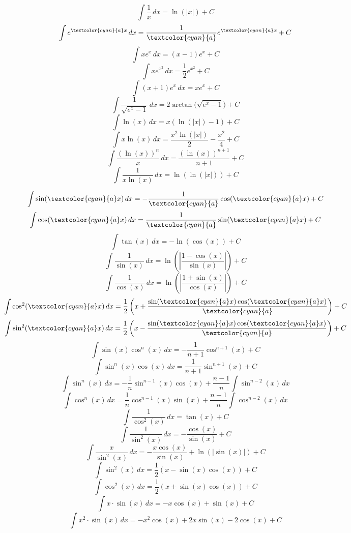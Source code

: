 \begin{formulabox}[breakable]
    \[
    \int \frac{1}{x}\,dx = \ln(|x|)+C
    \]
    \[
    \int e^{\textcolor{cyan}{a}x}\,dx = \frac{1}{\textcolor{cyan}{a}}e^{\textcolor{cyan}{a}x}+C
    \]
    \[
    \int x e^x\,dx = (x-1)e^x+C
    \]
    \[
    \int x e^{x^2}\,dx = \frac{1}{2}e^{x^2}+C
    \]
    \[
    \int (x+1)e^x\,dx = x e^x+C
    \]
    \[
    \int \frac{1}{\sqrt{e^x-1}}\,dx = 2\arctan\!\bigl(\sqrt{e^x-1}\bigr)+C
    \]
    \[
    \int \ln(x)\,dx = x(\ln(|x|)-1)+C
    \]
    \[
    \int x\ln(x)\,dx = \frac{x^2\ln(|x|)}{2}-\frac{x^2}{4}+C
    \]
    \[
    \int \frac{(\ln(x))^n}{x}\,dx = \frac{(\ln(x))^{n+1}}{n+1}+C
    \]
    \[
    \int \frac{1}{x\ln(x)}\,dx = \ln(\ln(|x|))+C
    \]
\end{formulabox}

\begin{formulabox}[breakable, break at=-\baselineskip/0pt]
    \[
    \int \sin(\textcolor{cyan}{a}x)\,dx = -\frac{1}{\textcolor{cyan}{a}}\cos(\textcolor{cyan}{a}x)+C
    \]
    \[
    \int \cos(\textcolor{cyan}{a}x)\,dx = \frac{1}{\textcolor{cyan}{a}}\sin(\textcolor{cyan}{a}x)+C
    \]
    \[
    \int \tan(x)\,dx = -\ln(\cos(x))+C
    \]
    \[
    \int \frac{1}{\sin(x)}\,dx = \ln\!\left(\left|\frac{1-\cos(x)}{\sin(x)}\right|\right)+C
    \]
    \[
    \int \frac{1}{\cos(x)}\,dx = \ln\!\left(\left|\frac{1+\sin(x)}{\cos(x)}\right|\right)+C
    \]
    \[
    \int \cos^2(\textcolor{cyan}{a}x)\,dx = \frac{1}{2}\left(x+\frac{\sin(\textcolor{cyan}{a}x)\cos(\textcolor{cyan}{a}x)}{\textcolor{cyan}{a}}\right)+C
    \]
    \[
    \int \sin^2(\textcolor{cyan}{a}x)\,dx = \frac{1}{2}\left(x-\frac{\sin(\textcolor{cyan}{a}x)\cos(\textcolor{cyan}{a}x)}{\textcolor{cyan}{a}}\right)+C
    \]
    \[
    \int \sin(x)\cos^n(x)\,dx = -\frac{1}{n+1}\cos^{n+1}(x)+C
    \]
    \[
    \int \sin^n(x)\cos(x)\,dx = \frac{1}{n+1}\sin^{n+1}(x)+C
    \]
    \[
    \int \sin^n(x)\,dx = -\frac{1}{n}\sin^{n-1}(x)\cos(x) + \frac{n-1}{n}\int \sin^{n-2}(x)\,dx
    \]
    \[
    \int \cos^n(x)\,dx = \frac{1}{n}\cos^{n-1}(x)\sin(x) + \frac{n-1}{n}\int \cos^{n-2}(x)\,dx
    \]
    \[
    \int \frac{1}{\cos^2(x)}\,dx = \tan(x)+C
    \]
    \[
    \int \frac{1}{\sin^2(x)}\,dx = -\frac{\cos(x)}{\sin(x)}+C
    \]
    \[
    \int \frac{x}{\sin^2(x)}\,dx = -\frac{x\cos(x)}{\sin(x)}+\ln(|\sin(x)|)+C
    \]
    \[
    \int \sin^2(x)\,dx = \frac{1}{2}(x-\sin(x)\cos(x))+C
    \]
    \[
    \int \cos^2(x)\,dx = \frac{1}{2}(x+\sin(x)\cos(x))+C
    \]
    \[
    \int x\cdot \sin(x)\,dx = -x\cos(x)+\sin(x)+C
    \]
    \[
    \int x^2\cdot \sin(x)\,dx = -x^2\cos(x)+2x\sin(x)-2\cos(x)+C
    \]
\end{formulabox}

